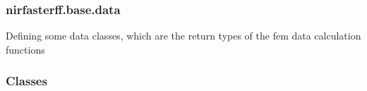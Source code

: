 \documentclass[letterpaper,10pt,english]{sphinxmanual}
\begin{document}
\sphinxstepscope


\subsubsection{nirfasterff.base.data}
\label{\detokenize{_autosummary/nirfasterff.base.data:module-nirfasterff.base.data}}\label{\detokenize{_autosummary/nirfasterff.base.data:nirfasterff-base-data}}\label{\detokenize{_autosummary/nirfasterff.base.data::doc}}
\sphinxAtStartPar
Defining some data classes, which are the return types of the fem data calculation functions
\subsubsection*{Classes}
\end{document}
